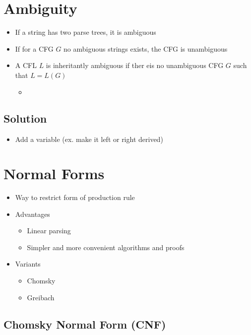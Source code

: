 \section{Ambiguity}

  \begin{itemize}
    \item If a string has two parse trees, it is ambiguous
    \item If for a CFG $ G $ no ambiguous strings exists, the CFG is unambiguous
    \item A CFL $ L $ is inheritantly ambiguous if ther eis no unambiguous
    CFG $ G $ such that $ L = L \left( G \right) $
    \begin{itemize}
      \item
    \end{itemize}
  \end{itemize}

  \subsection{Solution}

    \begin{itemize}
      \item Add a variable (ex. make it left or right derived)
    \end{itemize}

\section{Normal Forms}

  \begin{itemize}
    \item Way to restrict form of production rule
    \item Advantages
    \begin{itemize}
      \item Linear parsing
      \item Simpler and more convenient algorithms and proofs
    \end{itemize}

    \item Variants
    \begin{itemize}
      \item Chomsky
      \item Greibach
    \end{itemize}
  \end{itemize}

  \subsection{Chomsky Normal Form (CNF)}

